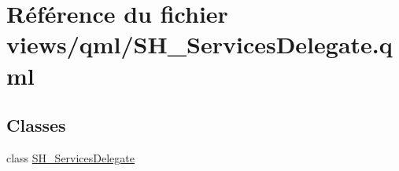 \hypertarget{SH__ServicesDelegate_8qml}{\section{Référence du fichier views/qml/\-S\-H\-\_\-\-Services\-Delegate.qml}
\label{SH__ServicesDelegate_8qml}
}
\subsection*{Classes}
\begin{DoxyCompactItemize}
\item 
class \hyperlink{classSH__ServicesDelegate}{S\-H\-\_\-\-Services\-Delegate}
\end{DoxyCompactItemize}
